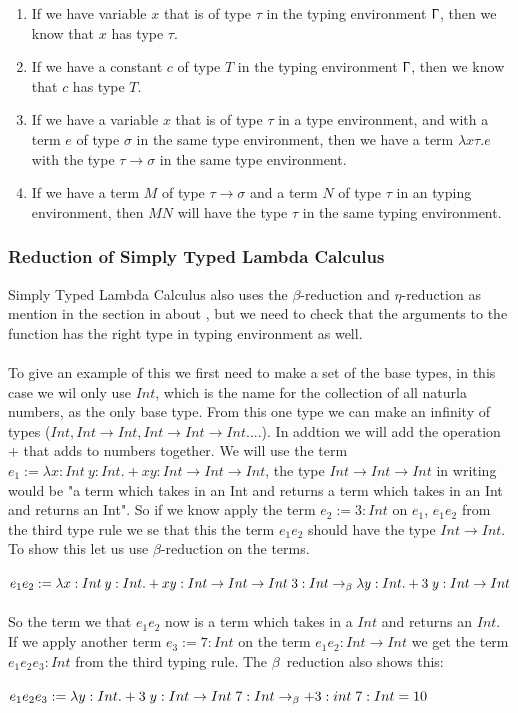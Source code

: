 \begin{enumerate}
    \item If we have variable $x$ that is of type $\tau$ in the typing environment $\Upgamma$, then we know that $x$ has type $\tau$.
    \item If we have a constant $c$ of type $T$ in the typing environment $\Upgamma$, then we know that $c$ has type $T$.
    \item If we have a variable $x$ that is of type $\tau$ in a type environment, and with a term $e$ of type $\sigma$ in the same type environment, then we have a term $\lambda x\tau .e$ with the type $\tau \rightarrow \sigma$ in the same type environment.
    \item If we have a term $M$ of type $\tau \rightarrow \sigma$ and a term $N$ of type $\tau$ in an typing environment, then $M N$ will have the type $\tau$ in the same typing environment.
\end{enumerate}

\subsubsection{Reduction of Simply Typed Lambda Calculus}
Simply Typed Lambda Calculus also uses the $\beta$-reduction and $\eta$-reduction as mention in the 
section in about , but we need to check that the arguments to the function has 
the right type in typing environment as well. 
\\ \\
To give an example of this we first need to make a set of the base types, in this case we wil only use $Int$, which is the name for the collection of all 
naturla numbers, as the only base type. From this one type we can make an infinity of types ($Int, Int \rightarrow Int, Int \rightarrow Int \rightarrow Int ....$).
In addtion we will add the operation $+$ that adds to numbers together.
We will use the term $e_1:= \lambda x:Int\: y:Int. + x y:Int \rightarrow Int \rightarrow Int$, the type $Int \rightarrow Int \rightarrow Int$ in writing would be "a term
which takes in an Int and returns a term which takes in an Int and returns an Int". 
So if we know apply the term $e_2 := 3:Int$ on $e_1$, $e_1 e_2$ from the third type rule we se that this the term 
$e_1 e_2$ should have the type $Int \rightarrow Int$. To show this let us use $\beta$-reduction on the terms.
\\ \\
$e_1 e_2 := \lambda x:Int\: y:Int. + x y:Int \rightarrow Int \rightarrow Int\; 3:Int 
\newline\rightarrow_\beta \lambda y:Int. + 3\; y: Int \rightarrow Int$
\\ \\
So the term we that $e_1 e_2 $ now is a term which takes in a $Int$ and returns an $Int$. If we apply another term
$e_3 := 7:Int$ on the term $e_1 e_2:Int \rightarrow Int$ we get the term $e_1 e_2 e_3:Int$ from the third typing rule.
The $\beta$ reduction also shows this: 
\\ \\
$e_1 e_2 e_3 := \lambda y:Int. + 3\; y: Int \rightarrow Int \; 7:Int
\newline \rightarrow_\beta + 3:int \; 7:Int = 10$

